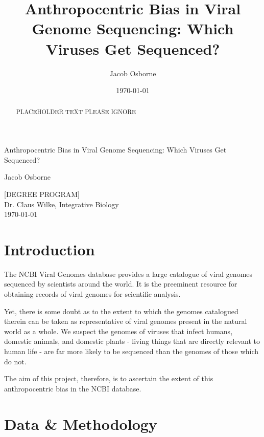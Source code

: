 \documentclass[12pt]{article}
\title{Anthropocentric Bias in Viral Genome Sequencing: Which Viruses Get Sequenced?}
\date{\today}
\author{Jacob Osborne}
\begin{document}

    \begin{titlepage}
        \begin{center}
            \vspace*{1in}
            \LARGE
            Anthropocentric Bias in Viral Genome Sequencing: Which Viruses Get Sequenced?

            \vspace*{1in}
            \large
            Jacob Osborne

            \vfill
            [DEGREE PROGRAM] \\
            Dr. Claus Wilke, Integrative Biology \\
            \today
        \end{center}
    \end{titlepage}
    
    \begin{abstract}
        PLACEHOLDER TEXT PLEASE IGNORE
    \end{abstract}

    \section{Introduction}

    The NCBI Viral Genomes database provides a large catalogue of viral genomes 
    sequenced by scientists around the world. It is the preeminent resource for
    obtaining records of viral genomes for scientific analysis.

    Yet, there is some doubt as to the extent to which the genomes catalogued
    therein can be taken as representative of viral genomes present in the
    natural world as a whole. We suspect the genomes of viruses that infect
    humans, domestic animals, and domestic plants - living things that are
    directly relevant to human life - are far more likely to be sequenced than
    the genomes of those which do not.

    The aim of this project, therefore, is to ascertain the extent of this
    anthropocentric bias in the NCBI database.

    \section{Data \& Methodology}
\end{document}
